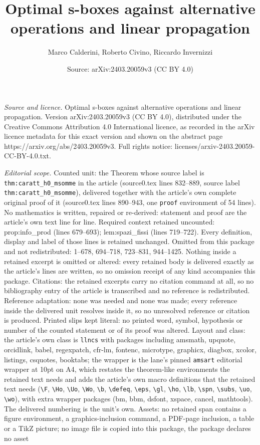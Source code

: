 \documentclass[10pt,a4paper]{amsart}
\title[Optimal s-boxes against alternative operations and linear pr]{Optimal s-boxes against alternative operations and linear propagation}
\author{Marco Calderini, Roberto Civino, Riccardo Invernizzi}
\date{Source: arXiv:2403.20059v3 (CC BY 4.0)}
\begin{document}
\maketitle

\noindent\emph{Source and licence.} Optimal s-boxes against alternative operations and linear propagation. Version arXiv:2403.20059v3 (CC BY 4.0), distributed under the Creative Commons Attribution 4.0 International licence, as recorded in the arXiv licence metadata for this exact version and shown on the abstract page https://arxiv.org/abs/2403.20059v3. Full rights notice: licenses/arxiv-2403.20059-CC-BY-4.0.txt.\par\smallskip

\noindent\textit{Editorial scope.} Counted unit: the Theorem whose source label is \texttt{thm:caratt\_h0\_msomme} in the article (source0.tex lines 832--889, source label \texttt{thm:caratt\_h0\_msomme}), delivered together with the article's own complete original proof of it (source0.tex lines 890--943, one \texttt{proof} environment of 54 lines). No mathematics is written, repaired or re-derived: statement and proof are the article's own text line for line. Required context retained uncounted: prop:info\_prod (lines 679--693); lem:spazi\_fissi (lines 719--722). Every definition, display and label of those lines is retained unchanged. Omitted from this package and not redistributed: 1--678, 694--718, 723--831, 944--1425. Nothing inside a retained excerpt is omitted or altered: every retained body is delivered exactly as the article's lines are written, so no omission receipt of any kind accompanies this package. Citations: the retained excerpts carry no citation command at all, so no bibliography entry of the article is transcribed and no reference is redistributed. Reference adaptation: none was needed and none was made; every reference inside the delivered unit resolves inside it, so no unresolved reference or citation is produced. Printed slips kept literal: no printed word, symbol, hypothesis or number of the counted statement or of its proof was altered. Layout and class: the article's own class is \texttt{llncs} with packages including amsmath, upquote, orcidlink, babel, regexpatch, cfr-lm, fontenc, microtype, graphicx, diagbox, xcolor, listings, csquotes, booktabs; the wrapper is the lane's pinned \texttt{amsart} editorial wrapper at 10pt on A4, which restates the theorem-like environments the retained text needs and adds the article's own macro definitions that the retained text needs (\texttt{\textbackslash F}, \texttt{\textbackslash Ho}, \texttt{\textbackslash Uo}, \texttt{\textbackslash Wo}, \texttt{\textbackslash b}, \texttt{\textbackslash defeq}, \texttt{\textbackslash eps}, \texttt{\textbackslash gl}, \texttt{\textbackslash ho}, \texttt{\textbackslash lb}, \texttt{\textbackslash spn}, \texttt{\textbackslash subs}, \texttt{\textbackslash uo}, \texttt{\textbackslash wo}), with extra wrapper packages (bm, bbm, dsfont, xspace, cancel, mathtools). The delivered numbering is the unit's own. Assets: no retained span contains a figure environment, a graphics-inclusion command, a PDF-page inclusion, a table or a TikZ picture; no image file is copied into this package, the package declares no asset 
\end{document}
